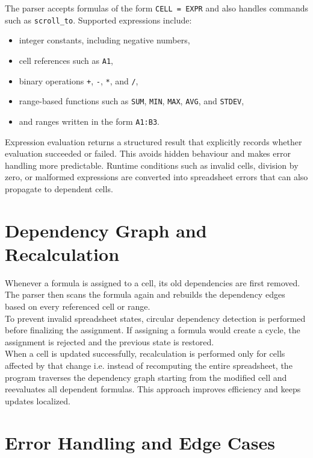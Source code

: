 \documentclass[12pt,a4paper]{article}
\begin{document}
The parser accepts formulas of the form \texttt{CELL = EXPR} and also handles commands such as \texttt{scroll\_to}. Supported expressions include:
\begin{itemize}
    \item integer constants, including negative numbers,
    \item cell references such as \texttt{A1},
    \item binary operations \texttt{+}, \texttt{-}, \texttt{*}, and \texttt{/},
    \item range-based functions such as \texttt{SUM}, \texttt{MIN}, \texttt{MAX}, \texttt{AVG}, and \texttt{STDEV},
    \item and ranges written in the form \texttt{A1:B3}.
\end{itemize}

Expression evaluation returns a structured result that explicitly records whether evaluation succeeded or failed. This avoids hidden behaviour and makes error handling more predictable. Runtime conditions such as invalid cells, division by zero, or malformed expressions are converted into spreadsheet errors that can also propagate to dependent cells.

\section{Dependency Graph and Recalculation}

Whenever a formula is assigned to a cell, its old dependencies are first removed. The parser then scans the formula again and rebuilds the dependency edges based on every referenced cell or range.\\[0.1cm]

To prevent invalid spreadsheet states, circular dependency detection is performed before finalizing the assignment. If assigning a formula would create a cycle, the assignment is rejected and the previous state is restored.\\[0.1cm]

When a cell is updated successfully, recalculation is performed only for cells affected by that change i.e. instead of recomputing the entire spreadsheet, the program traverses the dependency graph starting from the modified cell and reevaluates all dependent formulas. This approach improves efficiency and keeps updates localized.

\section{Error Handling and Edge Cases}
\end{document}
